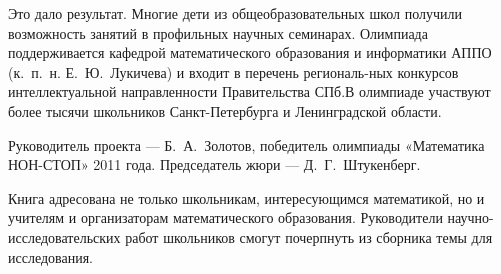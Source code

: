 \ms\abz Это дало результат. Многие дети из общеобразовательных школ получили возможность занятий в профильных научных семинарах. Олимпиада поддерживается кафедрой математического образования и информатики АППО (к.~п.~н. Е.~Ю.~Лукичева) и входит в перечень региональ-\linebreak ных конкурсов интеллектуальной направленности Правительства СПб.\linebreak В олимпиаде участвуют более тысячи школьников Санкт-Петербурга и Ленинградской области.

\ms\abz Руководитель проекта — Б.~А.~Золотов, победитель олимпиады «Математика НОН-СТОП» 2011 года. Председатель жюри — Д.~Г.~Штукенберг.   

\ms\abz Книга адресована не только школьникам, интересующимся математикой, но и учителям и организаторам математического образования. Руководители научно-исследовательских работ школьников смогут почерпнуть из сборника темы для исследования.